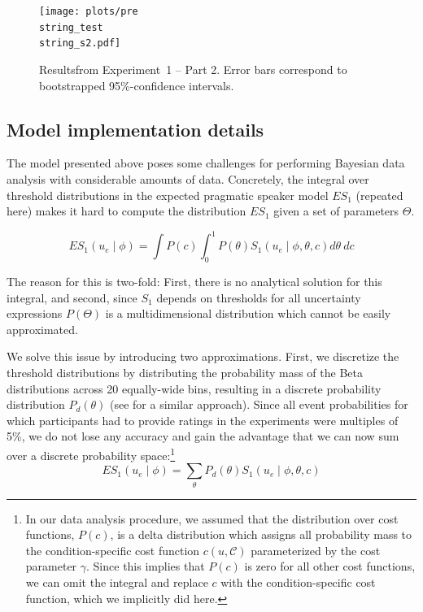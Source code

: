 \documentclass[man, floatsintext]{apa6}
\begin{document}
\begin{figure}[h!]
\texttt{[image: plots/pre\\string\_test\\string\_s2.pdf]}
\caption{Resultsfrom Experiment~1  -- Part 2. Error bars correspond to bootstrapped 95\%-confidence intervals. \label{fig:norming-results-2}}

\end{figure}

\pagebreak

\subsection*{Model implementation details}

The model presented above poses some challenges for performing Bayesian data analysis with considerable amounts of data. 
Concretely, the integral over threshold distributions in the expected pragmatic speaker model $ES_1$ (repeated here) makes it hard to compute 
the distribution $ES_1$ given a set of parameters $\Theta$.

$$ES_1\left(u_e \mid \phi \right) = \int P(c) \int_0^1 P(\theta) S_1\left(u _e\mid \phi, \theta, c\right) d\theta \  d c$$

The reason for this is two-fold: First, there is no analytical solution for this integral, and second, since $S_1$ depends on
thresholds for all uncertainty expressions $P(\Theta)$ is a multidimensional distribution which cannot be easily approximated.

We solve this issue by introducing two approximations. First, we discretize the threshold distributions by distributing the probability mass
of the Beta distributions across 20 equally-wide bins, resulting in a discrete probability distribution $P_{d}(\theta)$ (see \cite{Tessler2019} for a similar approach). Since all event probabilities for which participants had to provide ratings in the
experiments were multiples of 5\%, we do not lose any accuracy and gain the advantage that we can now sum over a discrete probability space:\footnote{In our data analysis procedure, we assumed that the 
distribution over cost functions, $P(c)$, is a delta distribution which assigns all probability mass to the condition-specific cost function 
$c(u, \mathscr{C})$ parameterized by the cost parameter $\gamma$. Since this implies that $P(c)$ is zero for all other cost functions, we can omit the integral and replace $c$ 
with the condition-specific cost function, which we implicitly did here.}
$$ES_1\left(u_e \mid \phi \right) = \sum_{\theta} P_{d}(\theta) S_1\left(u _e\mid \phi, \theta, c\right)$$
\end{document}
